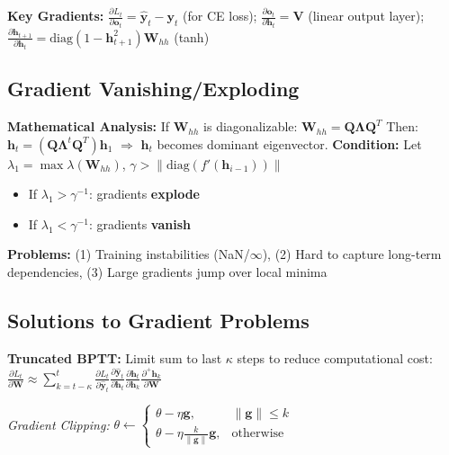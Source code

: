 \textbf{Key Gradients:} {\small $\frac{\partial L_t}{\partial \mathbf{o}_t} = \hat{\mathbf{y}}_t - \mathbf{y}_t$ (for CE loss); $\frac{\partial \mathbf{o}_t}{\partial \mathbf{h}_t} = \mathbf{V}$ (linear output layer); $\frac{\partial \mathbf{h}_{t+1}}{\partial \mathbf{h}_t} = \text{diag}(1 - \mathbf{h}_{t+1}^2) \mathbf{W}_{hh}$ (tanh)}

\subsection{Gradient Vanishing/Exploding}

\textbf{Mathematical Analysis:} If $\mathbf{W}_{hh}$ is diagonalizable: $\mathbf{W}_{hh} = \mathbf{Q} \boldsymbol{\Lambda} \mathbf{Q}^T$
Then: $\mathbf{h}_t = (\mathbf{Q} \boldsymbol{\Lambda}^t \mathbf{Q}^T) \mathbf{h}_1$ $\Rightarrow$ $\mathbf{h}_t$ becomes dominant eigenvector. 
\textbf{Condition:} Let $\lambda_1 = \max \lambda(\mathbf{W}_{hh})$, $\gamma > \|\text{diag}(f'(\mathbf{h}_{i-1}))\|$
\begin{itemize}
    \item If $\lambda_1 > \gamma^{-1}$: gradients \textbf{explode}
    \item If $\lambda_1 < \gamma^{-1}$: gradients \textbf{vanish}
\end{itemize}

\textbf{Problems:} (1) Training instabilities (NaN/$\infty$), (2) Hard to capture long-term dependencies, (3) Large gradients jump over local minima

\subsection{Solutions to Gradient Problems}

\textbf{Truncated BPTT:} Limit sum to last $\kappa$ steps to reduce computational cost: {\footnotesize $\frac{\partial L_t}{\partial \mathbf{W}} \approx \sum_{k=t-\kappa}^t \frac{\partial L_t}{\partial \hat{\mathbf{y}}_t} \frac{\partial \hat{\mathbf{y}}_t}{\partial \mathbf{h}_t} \frac{\partial \mathbf{h}_t}{\partial \mathbf{h}_k} \frac{\partial^+ \mathbf{h}_k}{\partial \mathbf{W}}$}

\emph{Gradient Clipping:} 
{
\footnotesize
$\theta \leftarrow 
\begin{cases}
\theta - \eta \mathbf{g}, & \|\mathbf{g}\| \leq k \\
\theta - \eta \frac{k}{\|\mathbf{g}\|} \mathbf{g}, & \text{otherwise}
\end{cases}$
}

